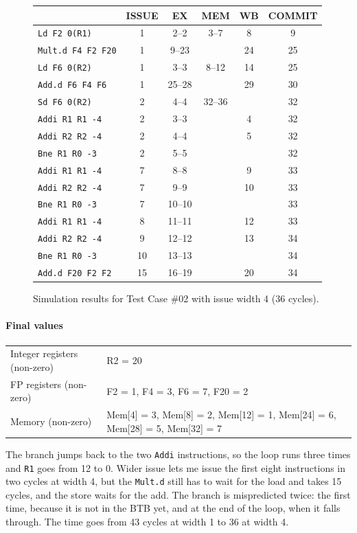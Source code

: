 \documentclass[11pt]{article}
\renewcommand{\_}{\origunderscore\allowbreak}
\begin{document}
\begin{figure}[H]
\centering
\small
\begin{tabular}{lccccc}
\hline
 & ISSUE & EX & MEM & WB & COMMIT \\
\hline
\texttt{Ld F2 0(R1)} & 1 & 2--2 & 3--7 & 8 & 9 \\
\texttt{Mult.d F4 F2 F20} & 1 & 9--23 &  & 24 & 25 \\
\texttt{Ld F6 0(R2)} & 1 & 3--3 & 8--12 & 14 & 25 \\
\texttt{Add.d F6 F4 F6} & 1 & 25--28 &  & 29 & 30 \\
\texttt{Sd F6 0(R2)} & 2 & 4--4 & 32--36 &  & 32 \\
\texttt{Addi R1 R1 -4} & 2 & 3--3 &  & 4 & 32 \\
\texttt{Addi R2 R2 -4} & 2 & 4--4 &  & 5 & 32 \\
\texttt{Bne R1 R0 -3} & 2 & 5--5 &  &  & 32 \\
\texttt{Addi R1 R1 -4} & 7 & 8--8 &  & 9 & 33 \\
\texttt{Addi R2 R2 -4} & 7 & 9--9 &  & 10 & 33 \\
\texttt{Bne R1 R0 -3} & 7 & 10--10 &  &  & 33 \\
\texttt{Addi R1 R1 -4} & 8 & 11--11 &  & 12 & 33 \\
\texttt{Addi R2 R2 -4} & 9 & 12--12 &  & 13 & 34 \\
\texttt{Bne R1 R0 -3} & 10 & 13--13 &  &  & 34 \\
\texttt{Add.d F20 F2 F2} & 15 & 16--19 &  & 20 & 34 \\
\hline
\end{tabular}
\caption{Simulation results for Test Case \#02 with issue width 4 (36 cycles).}
\end{figure}

\paragraph{Final values}
\begin{tabularx}{\textwidth}{lX}
\hline
Integer registers (non-zero) & R2 = 20 \\
FP registers (non-zero) & F2 = 1, F4 = 3, F6 = 7, F20 = 2 \\
Memory (non-zero) & Mem[4] = 3, Mem[8] = 2, Mem[12] = 1, Mem[24] = 6, Mem[28] = 5, Mem[32] = 7 \\
\hline
\end{tabularx}

The branch jumps back to the two \texttt{Addi} instructions, so the loop runs three times and
\texttt{R1} goes from 12 to 0. Wider issue lets me issue the first eight instructions in two
cycles at width 4, but the \texttt{Mult.d} still has to wait for the load and takes 15 cycles,
and the store waits for the add. The branch is mispredicted twice: the first time, because it
is not in the BTB yet, and at the end of the loop, when it falls through. The time goes from
43 cycles at width 1 to 36 at width 4.
\end{document}
